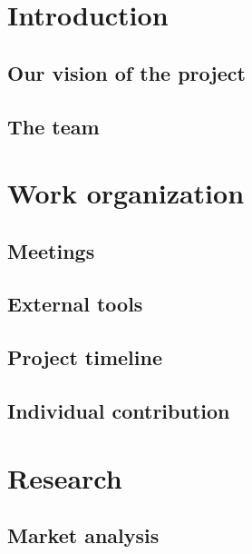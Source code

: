 \documentclass[a4paper, 11pt, article]{report}
\begin{document}

\tableofcontents
\newpage

\chapter{Introduction}

\section{Our vision of the project}

\section{The team}


\chapter{Work organization}
   
\section{Meetings}
   
\section{External tools}

\section{Project timeline}

\section{Individual contribution}


\chapter{Research}

\section{Market analysis}
\end{document}
